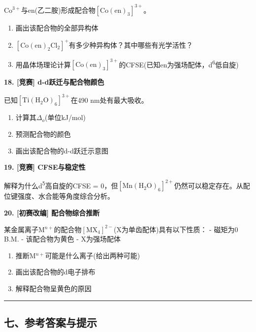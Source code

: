 \documentclass[a4paper,11pt]{ctexart}
\providecommand{\tightlist}{\setlength{\itemsep}{0pt}\setlength{\parskip}{0pt}}
\newcommand{\箭}{\ensuremath{\rightarrow}}
\newcommand{\左箭}{\ensuremath{\leftarrow}}
\newcommand{\上箭}{\ensuremath{\uparrow}}
\newcommand{\下箭}{\ensuremath{\downarrow}}
\newcommand{\衡}{\ensuremath{\rightleftharpoons}}
\newcommand{\双箭}{\ensuremath{\leftrightarrow}}
\newcommand{\约等于}{\ensuremath{\approx}}
\newcommand{\小于等于}{\ensuremath{\leq}}
\newcommand{\大于等于}{\ensuremath{\geq}}
\newcommand{\不等于}{\ensuremath{\neq}}
\newcommand{\西格马}{\ensuremath{\sigma}}
\newcommand{\派}{\ensuremath{\pi}}
\begin{document}
\(\mathrm{Co^{3+}}\)与en(乙二胺)形成配合物\(\mathrm{[Co(en)_3]^{3+}}\)。

\begin{enumerate}
\def\labelenumi{(\alph{enumi})}
\tightlist
\item
  画出该配合物的全部异构体
\item
  \(\mathrm{[Co(en)_2Cl_2]^+}\)有多少种异构体？其中哪些有光学活性？
\item
  用晶体场理论计算\(\mathrm{[Co(en)_3]^{3+}}\)的CFSE(已知en为强场配体，d\textsuperscript{6}低自旋)
\end{enumerate}

\textbf{18. {[}竞赛{]} d-d跃迁与配合物颜色}

已知\(\mathrm{[Ti(H_2O)_6]^{3+}}\)在490 nm处有最大吸收。

\begin{enumerate}
\def\labelenumi{(\alph{enumi})}
\tightlist
\item
  计算其\(\Delta_o\)(单位kJ/mol)
\item
  预测配合物的颜色
\item
  画出该配合物的d-d跃迁示意图
\end{enumerate}

\textbf{19. {[}竞赛{]} CFSE与稳定性}

解释为什么d\textsuperscript{5}高自旋的CFSE = 0，但\(\mathrm{[Mn(H_2O)_6]^{2+}}\)仍然可以稳定存在。从配位键强度、水合能等角度综合分析。

\textbf{20. {[}初赛改编{]} 配合物综合推断}

某金属离子M\(^{n+}\)的配合物\(\mathrm{[MX_4]^{2-}}\)(X为单齿配体)具有以下性质：
- 磁矩为0 B.M.
- 该配合物为黄色
- X为强场配体

\begin{enumerate}
\def\labelenumi{(\alph{enumi})}
\tightlist
\item
  推断M\(^{n+}\)可能是什么离子(给出两种可能)
\item
  画出该配合物的d电子排布
\item
  解释配合物呈黄色的原因
\end{enumerate}

\begin{center}\rule{0.5\linewidth}{0.5pt}\end{center}

\subsection{七、参考答案与提示}\label{ux4e03ux53c2ux8003ux7b54ux6848ux4e0eux63d0ux793a}
\end{document}
